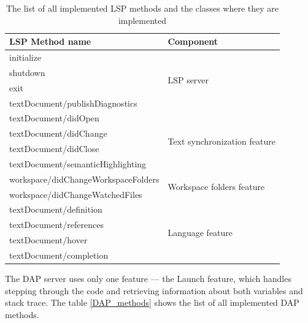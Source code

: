 \begin{table}
	\centering
	\begin{tabular}{ll}
		\toprule
		\textbf{LSP Method name}            & \textbf{Component}                              \\ \midrule
		initialize                          & \multirow{4}{5cm}{LSP server}                   \\
		shutdown                            &                                                 \\
		exit                                &                                                 \\
		textDocument/publishDiagnostics     &                                                 \\ \midrule
		textDocument/didOpen                & \multirow{4}{5cm}{Text synchronization feature} \\
		textDocument/didChange              &                                                 \\
		textDocument/didClose               &                                                 \\
		textDocument/semanticHighlighting   &                                                 \\ \midrule
		workspace/didChangeWorkspaceFolders & \multirow{2}{5cm}{Workspace folders feature}    \\
		workspace/didChangeWatchedFiles     &                                                 \\ \midrule
		textDocument/definition             & \multirow{4}{5cm}{Language feature}             \\
		textDocument/references             &                                                 \\
		textDocument/hover                  &                                                 \\
		textDocument/completion             &                                                 \\ \bottomrule
	\end{tabular}
	\caption{The list of all implemented LSP methods and the classes where they are implemented}
	\label{LSP_methods}
\end{table}

The DAP server uses only one feature --- the Launch feature, which handles stepping through the code and retrieving information about both variables and stack trace. The table \cref{DAP_methods} shows the list of all implemented DAP methods.

